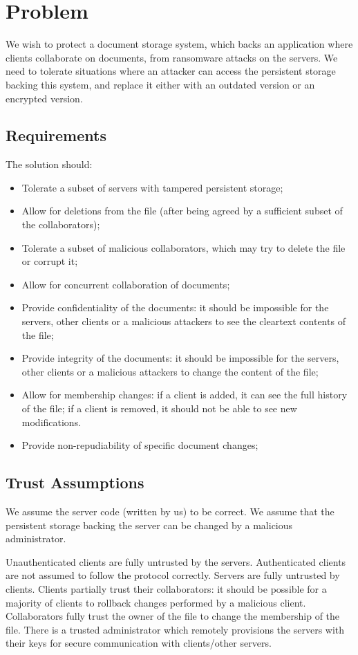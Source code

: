 \section{Problem}

We wish to protect a document storage system, which backs an
application where clients collaborate on documents, from
ransomware attacks on the servers. We need to tolerate situations
where an attacker can access the persistent storage backing this
system, and replace it either with an outdated version or an
encrypted version.

\subsection{Requirements}
The solution should:
\begin{itemize}
    \setlength{\itemsep}{0pt}
    \setlength{\parskip}{0pt}
    \setlength{\parsep}{0pt}
    \item Tolerate a subset of servers with tampered
        persistent storage;
    \item Allow for deletions from the file (after being
        agreed by a sufficient subset of the collaborators);
    \item Tolerate a subset of malicious collaborators, which
        may try to delete the file or corrupt it;
    \item Allow for concurrent collaboration of documents;
    \item Provide confidentiality of the documents: it should
        be impossible for the servers, other clients or a
        malicious attackers to see the cleartext contents of
        the file;
    \item Provide integrity of the documents: it should
        be impossible for the servers, other clients or a
        malicious attackers to change the content of
        the file;
    \item Allow for membership changes: if a client is added,
        it can see the full history of the file; if a client
        is removed, it should not be able to see new
        modifications.
    \item Provide non-repudiability of specific document changes;
\end{itemize}

\subsection{Trust Assumptions}
We assume the server code (written by us) to be correct. We
assume that the persistent storage backing the server can be
changed by a malicious administrator.

Unauthenticated clients are fully untrusted by the servers.
Authenticated clients are not assumed to follow the protocol
correctly. Servers are fully untrusted by clients. Clients
partially trust their collaborators: it should be possible for
a majority of clients to rollback changes performed by a malicious client.
Collaborators fully trust the owner of the file to change the
membership of the file. There is a trusted administrator which
remotely provisions the servers with their keys for secure
communication with clients/other servers.

